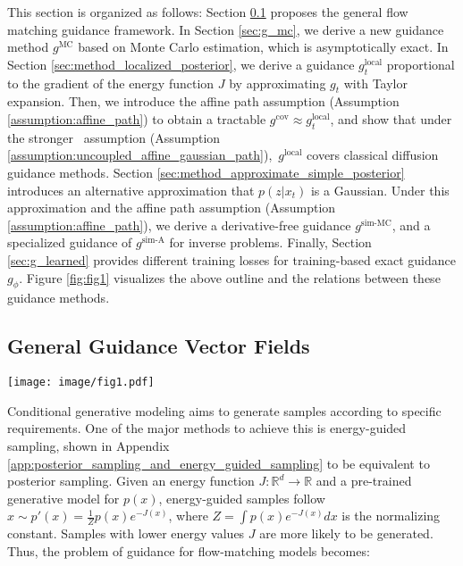 

This section is organized as follows: Section \ref{sec:general_g} proposes the general flow matching guidance framework. In Section \ref{sec:g_mc}, we derive a new guidance method $g^{\text{MC}}$ based on Monte Carlo estimation, which is asymptotically exact. In Section \ref{sec:method_localized_posterior}, we derive a guidance $g_t^{\text{local}}$ proportional to the gradient of the energy function $J$ by approximating $g_t$ with Taylor expansion. Then, we introduce the affine path assumption (Assumption \ref{assumption:affine_path}) to obtain a tractable $g^{\text{cov}}\approx g_t^{\text{local}}$, and show that under the stronger \diffusionpath~assumption (Assumption \ref{assumption:uncoupled_affine_gaussian_path}),~$g^{\text{local}}$ covers classical diffusion guidance methods. Section \ref{sec:method_approximate_simple_posterior} introduces an alternative approximation that $p(z|x_t)$ is a Gaussian. Under this approximation and the affine path assumption (Assumption \ref{assumption:affine_path}), we derive a derivative-free guidance $g^{\text{sim-MC}}$, and a specialized guidance of $g^{\text{sim-A}}$ for inverse problems. Finally, Section \ref{sec:g_learned} provides different training losses for training-based exact guidance $g_\phi$. Figure \ref{fig:fig1} visualizes the above outline and the relations between these guidance methods.

\subsection{General Guidance Vector Fields}\label{sec:general_g}
\begin{figure*}[t]
    \centering    \texttt{[image: image/fig1.pdf]}
    \vskip -0.1in
    \caption{Overview of guidance methods in the paper. We start with a unified guidance expression and derive different guidance methods, including training-free and training-based methods, and cover many classical diffusion guidances.}
    \label{fig:fig1}
    \vskip -0.1in
\end{figure*}

Conditional generative modeling aims to generate samples according to specific requirements. One of the major methods to achieve this is energy-guided sampling, shown in Appendix \ref{app:posterior_sampling_and_energy_guided_sampling} to be equivalent to posterior sampling. Given an energy function $J: \mathbb{R}^d\to \mathbb{R}$ and a pre-trained generative model for $p(x)$, energy-guided samples follow $x\sim p'(x) = \frac{1}{Z}p(x)e^{-J(x)}$, where $Z=\int p(x)e^{-J(x)}dx $ is the normalizing constant. Samples with lower energy values $J$ are more likely to be generated. Thus, the problem of guidance for flow-matching models becomes:

